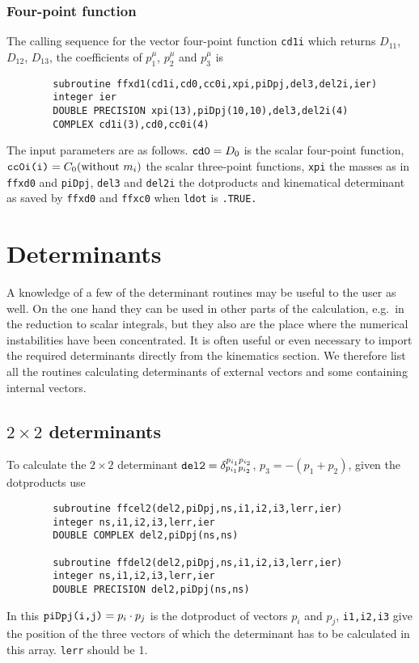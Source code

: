 \subsubsection{Four-point function}

The calling sequence for the vector four-point function {\tt cd1i} which 
returns $D_{11}$, $D_{12}$, $D_{13}$, the coefficients of $p_1^\mu$, $p_2^\mu$ 
and $p_3^\mu$ is
\begin{verbatim}
        subroutine ffxd1(cd1i,cd0,cc0i,xpi,piDpj,del3,del2i,ier)
        integer ier                                        
        DOUBLE PRECISION xpi(13),piDpj(10,10),del3,del2i(4)
        COMPLEX cd1i(3),cd0,cc0i(4)                        
\end{verbatim}
The input parameters are as follows.  $\mbox{\tt cd0} = D_0$ is the scalar 
four-point function, $\mbox{\tt cc0i(i)} = C_0(\mbox{without }m_i)$ the scalar 
three-point functions, {\tt xpi} the masses as in {\tt ffxd0} and {\tt piDpj}, 
{\tt del3} and {\tt del2i} the dotproducts and kinematical determinant as 
saved by {\tt ffxd0} and {\tt ffxc0} when {\tt ldot} is {\tt .TRUE.}

\section{Determinants}
\label{sc:determinants}

A knowledge of a few of the determinant routines may be useful to the user as 
well.   On the one hand they can be used in other parts of the calculation, 
e.g.\ in the reduction to scalar integrals, but they also are the place where 
the numerical instabilities have been concentrated.  It is often useful or 
even necessary to import the required determinants directly from the 
kinematics section.  We therefore list all the routines calculating 
determinants of external vectors and some containing internal vectors.

\subsection{$2\times2$ determinants}

To calculate the $2\times2$ determinant $\mbox{\tt del2} = 
\delta^{p_{i_1}p_{i_2}}_{p_{i_1}p_{i_2}}$, $p_3 = -(p_1+p_2)$, given the 
dotproducts use
\begin{verbatim}
        subroutine ffcel2(del2,piDpj,ns,i1,i2,i3,lerr,ier)
        integer ns,i1,i2,i3,lerr,ier
        DOUBLE COMPLEX del2,piDpj(ns,ns)

        subroutine ffdel2(del2,piDpj,ns,i1,i2,i3,lerr,ier)
        integer ns,i1,i2,i3,lerr,ier
        DOUBLE PRECISION del2,piDpj(ns,ns)
\end{verbatim}
In this $\mbox{\tt piDpj(i,j)} = p_i \cdot p_j$ is the dotproduct of vectors 
$p_i$ and $p_j$, {\tt i1,i2,i3} give the position of the three vectors of 
which the determinant has to be calculated in this array.  {\tt lerr} should 
be 1.

